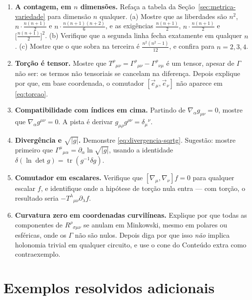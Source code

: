 \documentclass[12pt,a4paper,oneside]{book}
\theoremstyle{rgplain}
\theoremstyle{rgremark}
\begin{document}
\begin{enumerate}
  \item \textbf{A contagem, em $n$ dimensões.} Refaça a tabela da
  Seção~\ref{sec:metrica-variedade} para dimensão $n$ qualquer. (a) Mostre que
  as liberdades são $n^2$, $n\cdot\frac{n(n+1)}{2}$ e
  $n\cdot\frac{n(n+1)(n+2)}{6}$, e as exigências $\frac{n(n+1)}{2}$,
  $n\cdot\frac{n(n+1)}{2}$ e $\bigl[\frac{n(n+1)}{2}\bigr]^2$. (b) Verifique
  que a segunda linha fecha exatamente em qualquer $n$. (c) Mostre que o que
  sobra na terceira é $\frac{n^2(n^2-1)}{12}$, e confira para $n=2,3,4$.

  \item \textbf{Torção é tensor.} Mostre que
  $T^\rho{}_{\mu\nu}=\Gamma^\rho{}_{\mu\nu}-\Gamma^\rho{}_{\nu\mu}$ é um
  tensor, apesar de $\Gamma$ não ser: os termos não tensoriais se cancelam na
  diferença. Depois explique por que, em base coordenada, o comutador
  $[\vec e_\mu,\vec e_\nu]$ não aparece em \eqref{eq:torcao}.

  \item \textbf{Compatibilidade com índices em cima.} Partindo de
  $\nabla_\alpha g_{\mu\nu}=0$, mostre que $\nabla_\alpha g^{\mu\nu}=0$. A
  pista é derivar $g_{\mu\rho}g^{\rho\nu}=\delta_\mu{}^\nu$.

  \item \textbf{Divergência e $\sqrt{|g|}$.} Demonstre
  \eqref{eq:divergencia-sqrtg}. Sugestão: mostre primeiro que
  $\Gamma^\mu{}_{\mu\alpha}=\partial_\alpha\ln\sqrt{|g|}$, usando a identidade
  $\delta(\ln\det g)=\operatorname{tr}(g^{-1}\delta g)$.

  \item \textbf{Comutador em escalares.} Verifique que
  $[\nabla_\mu,\nabla_\nu]f=0$ para qualquer escalar $f$, e identifique onde a
  hipótese de torção nula entra --- com torção, o resultado seria
  $-T^\lambda{}_{\mu\nu}\partial_\lambda f$.

  \item \textbf{Curvatura zero em coordenadas curvilíneas.} Explique por que
  todas as componentes de $R^\rho{}_{\sigma\mu\nu}$ se anulam em Minkowski,
  mesmo em polares ou esféricas, onde os $\Gamma$ não são nulos. Depois diga
  por que isso \emph{não} implica holonomia trivial em qualquer circuito, e
  use o cone do Conteúdo extra como contraexemplo.
\end{enumerate}

\section{Exemplos resolvidos adicionais}
\end{document}
